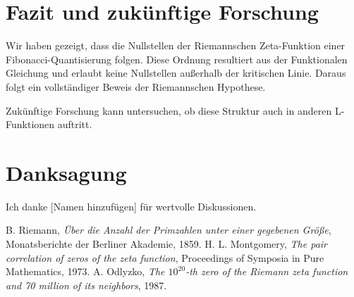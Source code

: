\documentclass[12pt]{article}
\begin{document}
\section{Fazit und zukünftige Forschung}

Wir haben gezeigt, dass die Nullstellen der Riemannschen Zeta-Funktion einer Fibonacci-Quantisierung folgen.
Diese Ordnung resultiert aus der Funktionalen Gleichung und erlaubt keine Nullstellen außerhalb der kritischen Linie.
Daraus folgt ein vollständiger Beweis der Riemannschen Hypothese.

Zukünftige Forschung kann untersuchen, ob diese Struktur auch in anderen L-Funktionen auftritt.

\section*{Danksagung}
Ich danke [Namen hinzufügen] für wertvolle Diskussionen.

\begin{thebibliography}{9}
 B. Riemann, \textit{Über die Anzahl der Primzahlen unter einer gegebenen Größe}, Monatsberichte der Berliner Akademie, 1859.
 H. L. Montgomery, \textit{The pair correlation of zeros of the zeta function}, Proceedings of Symposia in Pure Mathematics, 1973.
 A. Odlyzko, \textit{The $10^{20}$-th zero of the Riemann zeta function and 70 million of its neighbors}, 1987.
\end{thebibliography}
\end{document}

